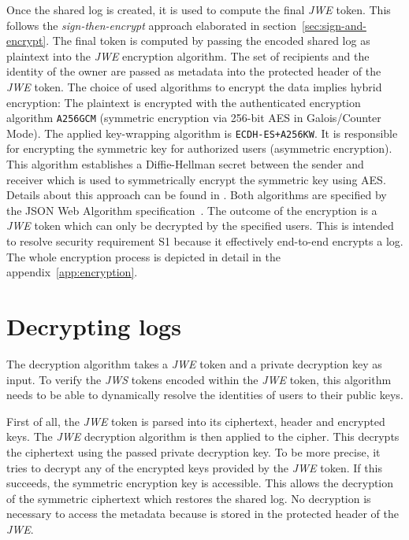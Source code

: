\documentclass[../main.tex]{subfiles}
\begin{document}
Once the  shared log is created, it is used to compute the final \textit{JWE} token.
This follows the \textit{sign-then-encrypt} approach elaborated in section~\ref{sec:sign-and-encrypt}.
The final token is computed by passing the encoded shared log as plaintext into the \textit{JWE} encryption algorithm.
The set of recipients and the identity of the owner are passed as metadata into the protected header of the \textit{JWE} token.
The choice of used algorithms to encrypt the data implies hybrid encryption:
The plaintext is encrypted with the authenticated encryption algorithm \verb|A256GCM| (symmetric encryption via 256-bit AES in Galois/Counter Mode).
The applied key-wrapping algorithm is \verb|ECDH-ES+A256KW|.
It is responsible for encrypting the symmetric key for authorized users (asymmetric encryption).
This algorithm establishes a Diffie-Hellman secret between the sender and receiver which is used to symmetrically encrypt the symmetric key using AES.
Details about this approach can be found in \cite[100]{Barker2017}.
Both algorithms are specified by the JSON Web Algorithm specification~\cite{Jones2015}.
The outcome of the encryption is a \textit{JWE} token which can only be decrypted by the specified users.
This is intended to resolve security requirement S1 because it effectively end-to-end encrypts a log.
The whole encryption process is depicted in detail in the appendix~\ref{app:encryption}.

\section{Decrypting logs}\label{sec:decrypting}

The decryption algorithm takes a \textit{JWE} token and a private decryption key as input.
To verify the \textit{JWS} tokens encoded within the \textit{JWE} token, this algorithm needs to be able to dynamically resolve the identities of users to their public keys.

First of all, the \textit{JWE} token is parsed into its ciphertext, header and encrypted keys.
The \textit{JWE} decryption algorithm is then applied to the cipher.
This decrypts the ciphertext using the passed private decryption key.
To be more precise, it tries to decrypt any of the encrypted keys provided by the \textit{JWE} token.
If this succeeds, the symmetric encryption key is accessible.
This allows the decryption of the symmetric ciphertext which restores the shared log.
No decryption is necessary to access the metadata because is stored in the protected header of the \textit{JWE}.
\end{document}
